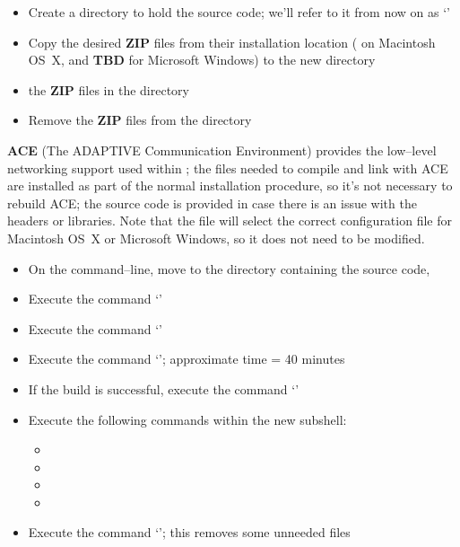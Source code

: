\tertiaryEnd{}
\secondaryEnd{}
\begin{itemize}
\item Create a directory to hold the source code; we'll refer to it from now on as
`'
\item Copy the desired \textbf{ZIP} files from their installation location
( on Macintosh OS~X, and \textbf{TBD} for Microsoft Windows) to the
new directory 
\item {} the \textbf{ZIP} files in the directory 
\item Remove the \textbf{ZIP} files from the  directory
\end{itemize}
\secondaryEnd{}
\textbf{ACE} (The ADAPTIVE Communication Environment) provides the low--level networking
support used within \mplusm{}; the files needed to compile and link with ACE are installed
as part of the normal \mplusm{} installation procedure, so it's not necessary to rebuild
ACE; the source code is provided in case there is an issue with the headers or libraries.
Note that the file  will select the correct
configuration file for Macintosh OS~X or Microsoft Windows, so it does not need to be
modified.
\begin{itemize}
\item On the command--line, move to the directory containing the \mplusm{} source code,
\item Execute the command `'
\item Execute the command `'
\item Execute the command `'; approximate time = 40 minutes
\item If the build is successful, execute the command `'
\item Execute the following commands within the new subshell:
\begin{itemize}
\item {}
\item {}
\item {}
\item {}
\end{itemize}
\item Execute the command `'; this removes some unneeded
files
\end{itemize}
